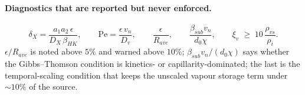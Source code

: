 \paragraph{Diagnostics that are reported but never enforced.}
\begin{equation}
  \delta_{X} = \frac{a_1 a_2\,\epsilon}{D_X\,\beta_{HK}},
  \qquad
  \mathrm{Pe} = \frac{\epsilon\,v_n}{D_v},
  \qquad
  \frac{\epsilon}{R_{ave}},
  \qquad
  \frac{\beta_{sub}v_n}{d_0\chi},
  \qquad
  \xi_v \;\ge\; 10\,\frac{\rho_{vs}}{\rho_i}.
  \label{eq:diagnostics}
\end{equation}
%
$\epsilon/R_{ave}$ is noted above $5\%$ and warned above $10\%$;
$\beta_{sub}v_n/(d_0\chi)$ says whether the Gibbs--Thomson condition is
kinetics- or capillarity-dominated; the last is the temporal-scaling
condition that keeps the unscaled vapour storage term under ${\sim}10\%$ of
the source.
